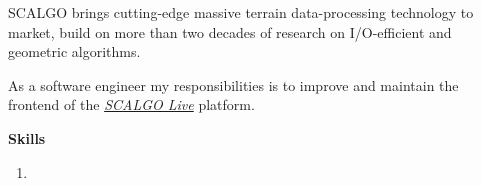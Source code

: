 SCALGO brings cutting-edge massive terrain data-processing technology to market,
build on more than two decades of research on I/O-efficient and geometric
algorithms.

\medskip

As a software engineer my responsibilities is to improve and maintain the
frontend of the \href{https://scalgo.com/live/}{\emph{SCALGO Live}} platform.

\medskip
{\color{accent} \textbf{Skills}}
\smallskip

\begin{enumerate}[leftmargin=2.5em] \small
\item[\indent\faWrench]     
\end{enumerate}
